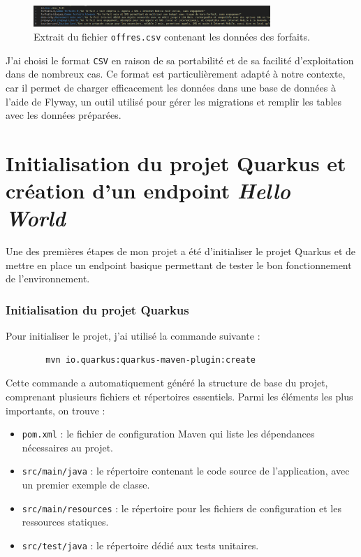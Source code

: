 \documentclass{article}
\begin{document}
	\begin{figure}[h!]
		\centering
		\includegraphics[width=0.8\textwidth]{asset/offres_csv.png}
		\caption{Extrait du fichier \texttt{offres.csv} contenant les données des forfaits.}
		\label{fig:offres_csv}
	\end{figure}
	
	J’ai choisi le format \texttt{CSV} en raison de sa portabilité et de sa facilité d’exploitation dans de nombreux cas. Ce format est particulièrement adapté à notre contexte, car il permet de charger efficacement les données dans une base de données à l’aide de Flyway, un outil utilisé pour gérer les migrations et remplir les tables avec les données préparées.
	
	\section{Initialisation du projet Quarkus et création d’un endpoint \textit{Hello World}}
	
	Une des premières étapes de mon projet a été d’initialiser le projet Quarkus et de mettre en place un endpoint basique permettant de tester le bon fonctionnement de l’environnement.
	
	\subsubsection{Initialisation du projet Quarkus}
	
	Pour initialiser le projet, j’ai utilisé la commande suivante :
	\begin{verbatim}
		mvn io.quarkus:quarkus-maven-plugin:create
	\end{verbatim}
	
	Cette commande a automatiquement généré la structure de base du projet, comprenant plusieurs fichiers et répertoires essentiels. Parmi les éléments les plus importants, on trouve :
	\begin{itemize}
		\item \texttt{pom.xml} : le fichier de configuration Maven qui liste les dépendances nécessaires au projet.
		\item \texttt{src/main/java} : le répertoire contenant le code source de l’application, avec un premier exemple de classe.
		\item \texttt{src/main/resources} : le répertoire pour les fichiers de configuration et les ressources statiques.
		\item \texttt{src/test/java} : le répertoire dédié aux tests unitaires.
	\end{itemize}
	
\end{document}
